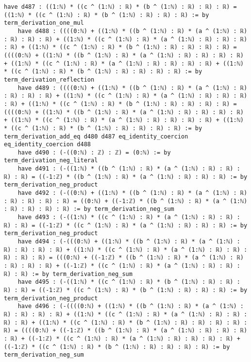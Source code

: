 \documentclass{article}
\begin{document}
\begin{tcolorbox}[colback=white!10, width=\linewidth]
\begin{lstlisting}[language=Lean4]
    have d487 : ((1:ℕ) * ((c ^ (1:ℕ) : ℝ) * (b ^ (1:ℕ) : ℝ) : ℝ) : ℝ) = ((1:ℕ) * ((c ^ (1:ℕ) : ℝ) * (b ^ (1:ℕ) : ℝ) : ℝ) : ℝ) := by term_derivation_one_mul
    have d488 : ((((0:ℕ) + ((1:ℕ) * ((b ^ (1:ℕ) : ℝ) * (a ^ (1:ℕ) : ℝ) : ℝ) : ℝ) : ℝ) + ((1:ℕ) * ((c ^ (1:ℕ) : ℝ) * (a ^ (1:ℕ) : ℝ) : ℝ) : ℝ) : ℝ) + ((1:ℕ) * ((c ^ (1:ℕ) : ℝ) * (b ^ (1:ℕ) : ℝ) : ℝ) : ℝ) : ℝ) = ((((0:ℕ) + ((1:ℕ) * ((b ^ (1:ℕ) : ℝ) * (a ^ (1:ℕ) : ℝ) : ℝ) : ℝ) : ℝ) + ((1:ℕ) * ((c ^ (1:ℕ) : ℝ) * (a ^ (1:ℕ) : ℝ) : ℝ) : ℝ) : ℝ) + ((1:ℕ) * ((c ^ (1:ℕ) : ℝ) * (b ^ (1:ℕ) : ℝ) : ℝ) : ℝ) : ℝ) := by term_derivation_reflection
    have d489 : ((((0:ℕ) + ((1:ℕ) * ((b ^ (1:ℕ) : ℝ) * (a ^ (1:ℕ) : ℝ) : ℝ) : ℝ) : ℝ) + ((1:ℕ) * ((c ^ (1:ℕ) : ℝ) * (a ^ (1:ℕ) : ℝ) : ℝ) : ℝ) : ℝ) + ((1:ℕ) * ((c ^ (1:ℕ) : ℝ) * (b ^ (1:ℕ) : ℝ) : ℝ) : ℝ) : ℝ) = ((((0:ℕ) + ((1:ℕ) * ((b ^ (1:ℕ) : ℝ) * (a ^ (1:ℕ) : ℝ) : ℝ) : ℝ) : ℝ) + ((1:ℕ) * ((c ^ (1:ℕ) : ℝ) * (a ^ (1:ℕ) : ℝ) : ℝ) : ℝ) : ℝ) + ((1:ℕ) * ((c ^ (1:ℕ) : ℝ) * (b ^ (1:ℕ) : ℝ) : ℝ) : ℝ) : ℝ) := by term_derivation_add_eq d480 d487 eq_identity_coercion eq_identity_coercion d488
    have d490 : (-((0:ℕ) : ℤ) : ℤ) = (0:ℕ) := by term_derivation_neg_literal
    have d491 : (-((1:ℕ) * ((b ^ (1:ℕ) : ℝ) * (a ^ (1:ℕ) : ℝ) : ℝ) : ℝ) : ℝ) = ((-1:ℤ) * ((b ^ (1:ℕ) : ℝ) * (a ^ (1:ℕ) : ℝ) : ℝ) : ℝ) := by term_derivation_neg_product
    have d492 : (-((0:ℕ) + ((1:ℕ) * ((b ^ (1:ℕ) : ℝ) * (a ^ (1:ℕ) : ℝ) : ℝ) : ℝ) : ℝ) : ℝ) = ((0:ℕ) + ((-1:ℤ) * ((b ^ (1:ℕ) : ℝ) * (a ^ (1:ℕ) : ℝ) : ℝ) : ℝ) : ℝ) := by term_derivation_neg_sum
    have d493 : (-((1:ℕ) * ((c ^ (1:ℕ) : ℝ) * (a ^ (1:ℕ) : ℝ) : ℝ) : ℝ) : ℝ) = ((-1:ℤ) * ((c ^ (1:ℕ) : ℝ) * (a ^ (1:ℕ) : ℝ) : ℝ) : ℝ) := by term_derivation_neg_product
    have d494 : (-(((0:ℕ) + ((1:ℕ) * ((b ^ (1:ℕ) : ℝ) * (a ^ (1:ℕ) : ℝ) : ℝ) : ℝ) : ℝ) + ((1:ℕ) * ((c ^ (1:ℕ) : ℝ) * (a ^ (1:ℕ) : ℝ) : ℝ) : ℝ) : ℝ) : ℝ) = (((0:ℕ) + ((-1:ℤ) * ((b ^ (1:ℕ) : ℝ) * (a ^ (1:ℕ) : ℝ) : ℝ) : ℝ) : ℝ) + ((-1:ℤ) * ((c ^ (1:ℕ) : ℝ) * (a ^ (1:ℕ) : ℝ) : ℝ) : ℝ) : ℝ) := by term_derivation_neg_sum
    have d495 : (-((1:ℕ) * ((c ^ (1:ℕ) : ℝ) * (b ^ (1:ℕ) : ℝ) : ℝ) : ℝ) : ℝ) = ((-1:ℤ) * ((c ^ (1:ℕ) : ℝ) * (b ^ (1:ℕ) : ℝ) : ℝ) : ℝ) := by term_derivation_neg_product
    have d496 : (-((((0:ℕ) + ((1:ℕ) * ((b ^ (1:ℕ) : ℝ) * (a ^ (1:ℕ) : ℝ) : ℝ) : ℝ) : ℝ) + ((1:ℕ) * ((c ^ (1:ℕ) : ℝ) * (a ^ (1:ℕ) : ℝ) : ℝ) : ℝ) : ℝ) + ((1:ℕ) * ((c ^ (1:ℕ) : ℝ) * (b ^ (1:ℕ) : ℝ) : ℝ) : ℝ) : ℝ) : ℝ) = ((((0:ℕ) + ((-1:ℤ) * ((b ^ (1:ℕ) : ℝ) * (a ^ (1:ℕ) : ℝ) : ℝ) : ℝ) : ℝ) + ((-1:ℤ) * ((c ^ (1:ℕ) : ℝ) * (a ^ (1:ℕ) : ℝ) : ℝ) : ℝ) : ℝ) + ((-1:ℤ) * ((c ^ (1:ℕ) : ℝ) * (b ^ (1:ℕ) : ℝ) : ℝ) : ℝ) : ℝ) := by term_derivation_neg_sum

\end{lstlisting}
\end{tcolorbox}
\end{document}
